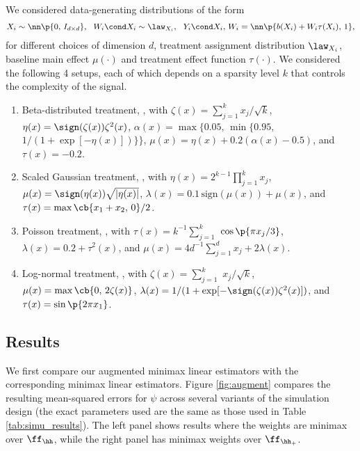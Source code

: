 \documentclass[aos,submission]{imsart}
\theoremstyle{plain}
\theoremstyle{remark}
\DeclarePairedDelimiter\abs{\lvert}{\rvert}
\begin{document}
We considered data-generating distributions of the form
\begin{equation*}
\begin{split}
X_i \sim \nn\p{0, \, I_{d \times d}}, \ \ W_i  \cond X_i \sim \law_{X_i}, \ \
Y_i \cond X_i, \, W_i = \nn\p{b(X_i) + W_i \tau(X_i) , \, 1},
\end{split}
\end{equation*}
for different choices of
dimension $d$,
treatment assignment distribution $\law_{X_i}$,
baseline main effect $\mu(\cdot)$ and
treatment effect function $\tau(\cdot)$.
We considered the following 4 setups, each of which depends on a sparsity level
$k$ that controls the complexity of the signal.
\begin{enumerate}
\item Beta-distributed treatment,
, with
$\zeta(x) = \sum_{j = 1}^k x_{j}/\sqrt{k}$,
$\eta(x) = \sign(\zeta(x)) \zeta^2(x)$,
$\alpha(x) = \max\{0.05, \, \min\{0.95, $ $ 1/(1 + \exp[-\eta(x)]) \}\}$,
$\mu(x) = \eta(x) + 0.2 (\alpha(x) - 0.5)$, and
$\tau(x) = -0.2$.
\item Scaled Gaussian treatment,
, with
$\eta(x) = 2^{k-1} \prod_{j = 1}^k x_j$,
$\mu(x) = \sign(\eta(x)) \sqrt{\abs{\eta(x)}}$,
$\lambda(x) = 0.1 \, \text{sign}(\mu(x)) + \mu(x)$, and
$\tau(x) = \max\cb{x_{1} + x_{2}, \, 0}/2$.
\item Poisson treatment,
, with
$\tau(x) = k^{-1} \sum_{j =1}^k$ $ \cos\p{\pi x_j /3}$,
$\lambda(x) = 0.2 + \tau^2(x)$, and
$\mu(x) = 4d^{-1}\sum_{j = 1}^d x_{j} + 2\lambda(x)$.
\item Log-normal treatment,
, with
$\zeta(x) = \sum_{j = 1}^k$ $x_{j}/\sqrt{k}$,
$\mu(x) = \max\cb{0, \, 2\zeta(x)}$,
$\lambda(x) = 1 / (1 + \exp[-\sign(\zeta(x))\zeta^2(x)])$, and
$\tau(x) = \sin\p{2\pi x_{1}}$.
\end{enumerate}

\subsection{Results}

We first compare our augmented minimax linear estimators with the corresponding minimax linear estimators.
Figure \ref{fig:augment} compares the resulting mean-squared errors for $\psi$ across
several variants of the simulation design (the exact parameters used are the same as those used in Table \ref{tab:simu_results}).
The left panel shows results where the weights are minimax over $\ff_{\hh}$, while the right panel has minimax weights over $\ff_{\hh_+}$.
 
\end{document}
